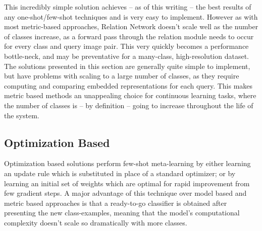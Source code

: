 \documentclass{report}
\begin{document}
This incredibly simple solution achieves -- as of this writing -- the best results of any one-shot/few-shot techniques and is very easy to implement. However as with most metric-based approaches, Relation Network doesn't scale well as the number of classes increase, as a forward pass through the relation module needs to occur for every class and query image pair. This very quickly becomes a performance bottle-neck, and may be preventative for a many-class, high-resolution dataset. \newline \newline
The solutions presented in this section are generally quite simple to implement, but have problems with scaling to a large number of classes, as they require computing and comparing embedded representations for each query. This makes metric based methods an unappealing choice for continuous learning tasks, where the number of classes is -- by definition -- going to increase throughout the life of the system. \par

\subsection{Optimization Based} \label{related-meta-opt:1}
Optimization based solutions perform few-shot meta-learning by either learning an update rule which is substituted in place of a standard optimizer; or by learning an initial set of weights which are optimal for rapid improvement from few gradient steps. A major advantage of this technique over model based and metric based approaches is that a ready-to-go classifier is obtained after presenting the new class-examples, meaning that the model's computational complexity doesn't scale so dramatically with more classes. \par
\end{document}

